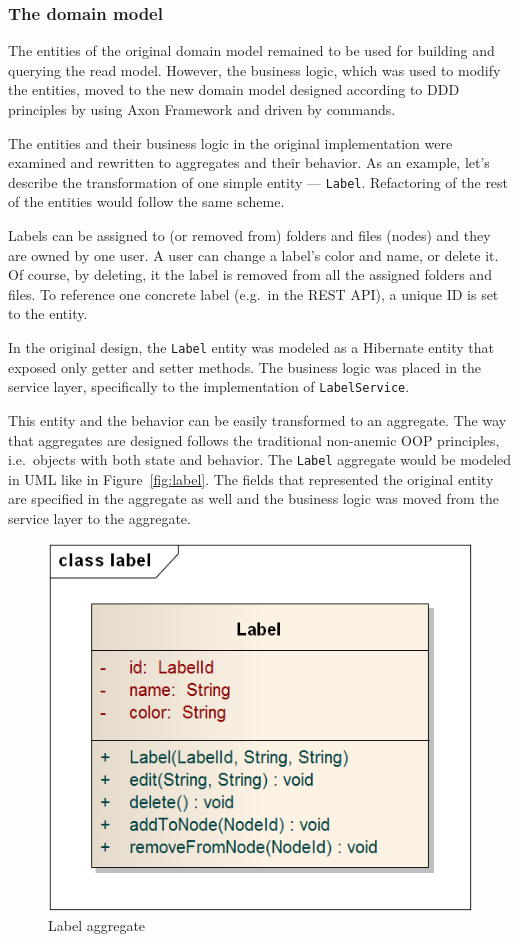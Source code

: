 \documentclass{book}
\begin{document}
\subsubsection{The domain model}\label{the-domain-model}

The entities of the original domain model remained to be used for
building and querying the read model. However, the business logic, which
was used to modify the entities, moved to the new domain model designed
according to DDD principles by using Axon Framework and driven by
commands.

The entities and their business logic in the original implementation
were examined and rewritten to aggregates and their behavior. As an
example, let's describe the transformation of one simple entity ---
\texttt{Label}. Refactoring of the rest of the entities would follow the
same scheme.

Labels can be assigned to (or removed from) folders and files (nodes)
and they are owned by one user. A user can change a label's color and
name, or delete it. Of course, by deleting, it the label is removed from
all the assigned folders and files. To reference one concrete label
(e.g.~in the REST API), a unique ID is set to the entity.

In the original design, the \texttt{Label} entity was modeled as a
Hibernate entity that exposed only getter and setter methods. The
business logic was placed in the service layer, specifically to the
implementation of \texttt{LabelService}.

This entity and the behavior can be easily transformed to an aggregate.
The way that aggregates are designed follows the traditional non-anemic
OOP principles, i.e.~objects with both state and behavior. The
\texttt{Label} aggregate would be modeled in UML like in Figure~\ref{fig:label}. The fields that represented the original entity are
specified in the aggregate as well and the business logic was moved from the
service layer to the aggregate.


\begin{figure}[h!]
\begin{center}
\includegraphics[width=0.4\columnwidth]{figures/label/label}
\caption{Label aggregate%
}
\end{center}
\end{figure}
\end{document}
